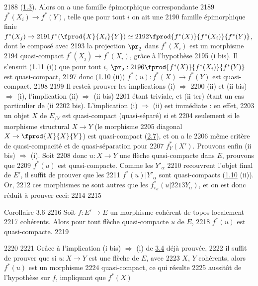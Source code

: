   2188	(\hyperref[VI.prop1.3]{1.3}). Alors on a une famille épimorphique correspondante
  2189	$f^{\ast}(X_i) \to f^{\ast}(Y)$, telle que pour tout $i$ on ait une
  2190	famille épimorphique finie $f^{\ast}(X_j) \to
  2191	f^{\ast}(\fprod{X}{X_i}{Y}) \simeq
  2192	\fprod{f^{\ast}(X)}{f^{\ast}(X_i)}{f^{\ast}(Y)}$, dont le composé avec
  2193	la projection $\pr_2$ dans $f^{\ast}(X_i)$ est un morphisme
  2194	quasi-compact $f^{\ast}(X_j) \to f^{\ast}(X_i)$, grâce à l'hypothèse
  2195	(i bis). Il s'ensuit (\hyperref[VI.cor1.11]{1.11} (i)) que pour tout $i$, $\pr_2 :
  2196	\fprod{f^{\ast}(X)}{f^{\ast}(X_i)}{f^{\ast}(Y)}$ est quasi-compact,
  2197	donc (\hyperref[VI.prop1.10]{1.10} (ii)) $f^{\ast}(u) : f^{\ast}(X) \to f^{\ast}(Y)$ est quasi-compact.
  2198	
  2199	Il reste\pageoriginale à prouver les implications (i) $\Rightarrow$
  2200	(ii) et  (ii bis) $\Rightarrow$ (i), l'implication  (ii) $\Rightarrow$ (ii bis)
  2201	étant triviale, et (ii ter) étant un cas particulier de (ii
  2202	bis). L'implication  (i) $\Rightarrow$ (ii) est immédiate : en effet,
  2203	un objet $X$ de $E_{/Y}$ est quasi-compact (\resp quasi-séparé) si et
  2204	seulement si le morphisme structural $X \to Y$ (\resp le morphisme
  2205	diagonal $X \to \fprod{X}{X}{Y}$) est quasi-compact (\hyperref[VI.cor2.7]{2.7}), et on a le
  2206	même critère de quasi-compacité et de quasi-séparation pour
  2207	$f^{\ast}_Y (X')$. Prouvons enfin  (ii bis) $\Rightarrow$ (i). Soit
  2208	donc $u : X \to Y$ une flèche quasi-compacte dans $E$, prouvons que
  2209	$f^{\ast}(u)$ est quasi-compacte. Comme les $Y'_{\alpha}$
  2210	recouvrent l'objet final de $E'$, il suffit de prouver que les
  2211	$f^{\ast}(u) | Y'_{\alpha}$ sont quasi-compacts (\hyperref[VI.prop1.10]{1.10} (ii)). Or,
  2212	ces morphismes ne sont autres que les $f^{\ast}_{v_\alpha}(u |
  2213	Y_{\alpha})$, et on est donc réduit à prouver ceci:
  2214	
  2215	\begin{enonce*}{Corollaire 3.6}
  2216	Soit $f : E'\to E$ un morphisme cohérent de topos localement
  2217	cohérents. Alors pour tout flèche quasi-compacte $u$ de $E$,
  2218	$f^{\ast}(u)$ est quasi-compacte.
  2219	\end{enonce*}
  2220	
  2221	Grâce à l'implication (i bis) $\Rightarrow$ (i) de \hyperref[VI.prop3.4]{3.4} déjà prouvée,
  2222	il suffit de prouver que si $u : X \to Y$ est une flèche de $E$, avec
  2223	$X$, $Y$ cohérents, alors $f^{\ast}(u)$ est un morphisme
  2224	quasi-compact, ce qui résulte
  2225	aussitôt de l'hypothèse sur $f$, impliquant que $f^{\ast}(X)$
